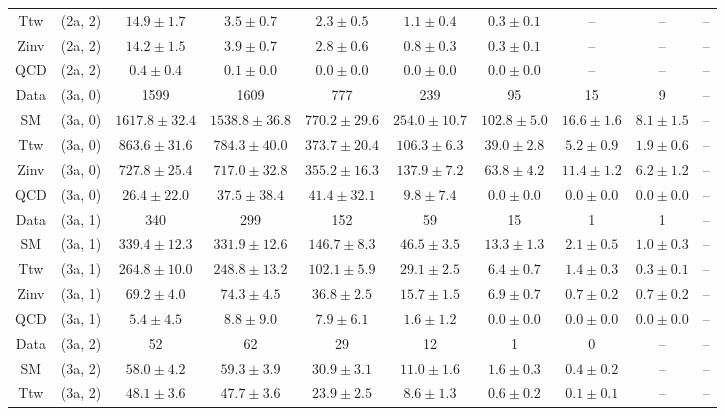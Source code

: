 \begin{table}[h!]
{\begin{tabular}{cccccccccc}
	Ttw & (2a, 2) & $14.9\pm 1.7$ & $3.5\pm 0.7$ & $2.3\pm 0.5$ & $1.1\pm 0.4$ & $0.3\pm 0.1$ & -- & -- & -- \\[0.5ex] 
	Zinv & (2a, 2) & $14.2\pm 1.5$ & $3.9\pm 0.7$ & $2.8\pm 0.6$ & $0.8\pm 0.3$ & $0.3\pm 0.1$ & -- & -- & -- \\[0.5ex] 
	QCD & (2a, 2) & $0.4\pm 0.4$ & $0.1\pm 0.0$ & $0.0\pm 0.0$ & $0.0\pm 0.0$ & $0.0\pm 0.0$ & -- & -- & -- \\[0.5ex] 
	Data & (3a, 0) & 1599 & 1609 & 777 & 239 & 95 & 15 & 9 & -- \\[0.5ex] 
	SM & (3a, 0) & $1617.8\pm 32.4$ & $1538.8\pm 36.8$ & $770.2\pm 29.6$ & $254.0\pm 10.7$ & $102.8\pm 5.0$ & $16.6\pm 1.6$ & $8.1\pm 1.5$ & -- \\[0.5ex] 
	Ttw & (3a, 0) & $863.6\pm 31.6$ & $784.3\pm 40.0$ & $373.7\pm 20.4$ & $106.3\pm 6.3$ & $39.0\pm 2.8$ & $5.2\pm 0.9$ & $1.9\pm 0.6$ & -- \\[0.5ex] 
	Zinv & (3a, 0) & $727.8\pm 25.4$ & $717.0\pm 32.8$ & $355.2\pm 16.3$ & $137.9\pm 7.2$ & $63.8\pm 4.2$ & $11.4\pm 1.2$ & $6.2\pm 1.2$ & -- \\[0.5ex] 
	QCD & (3a, 0) & $26.4\pm 22.0$ & $37.5\pm 38.4$ & $41.4\pm 32.1$ & $9.8\pm 7.4$ & $0.0\pm 0.0$ & $0.0\pm 0.0$ & $0.0\pm 0.0$ & -- \\[0.5ex] 
	Data & (3a, 1) & 340 & 299 & 152 & 59 & 15 & 1 & 1 & -- \\[0.5ex] 
	SM & (3a, 1) & $339.4\pm 12.3$ & $331.9\pm 12.6$ & $146.7\pm 8.3$ & $46.5\pm 3.5$ & $13.3\pm 1.3$ & $2.1\pm 0.5$ & $1.0\pm 0.3$ & -- \\[0.5ex] 
	Ttw & (3a, 1) & $264.8\pm 10.0$ & $248.8\pm 13.2$ & $102.1\pm 5.9$ & $29.1\pm 2.5$ & $6.4\pm 0.7$ & $1.4\pm 0.3$ & $0.3\pm 0.1$ & -- \\[0.5ex] 
	Zinv & (3a, 1) & $69.2\pm 4.0$ & $74.3\pm 4.5$ & $36.8\pm 2.5$ & $15.7\pm 1.5$ & $6.9\pm 0.7$ & $0.7\pm 0.2$ & $0.7\pm 0.2$ & -- \\[0.5ex] 
	QCD & (3a, 1) & $5.4\pm 4.5$ & $8.8\pm 9.0$ & $7.9\pm 6.1$ & $1.6\pm 1.2$ & $0.0\pm 0.0$ & $0.0\pm 0.0$ & $0.0\pm 0.0$ & -- \\[0.5ex] 
	Data & (3a, 2) & 52 & 62 & 29 & 12 & 1 & 0 & -- & -- \\[0.5ex] 
	SM & (3a, 2) & $58.0\pm 4.2$ & $59.3\pm 3.9$ & $30.9\pm 3.1$ & $11.0\pm 1.6$ & $1.6\pm 0.3$ & $0.4\pm 0.2$ & -- & -- \\[0.5ex] 
	Ttw & (3a, 2) & $48.1\pm 3.6$ & $47.7\pm 3.6$ & $23.9\pm 2.5$ & $8.6\pm 1.3$ & $0.6\pm 0.2$ & $0.1\pm 0.1$ & -- & -- \\[0.5ex] 

\end{tabular}}
\end{table}
